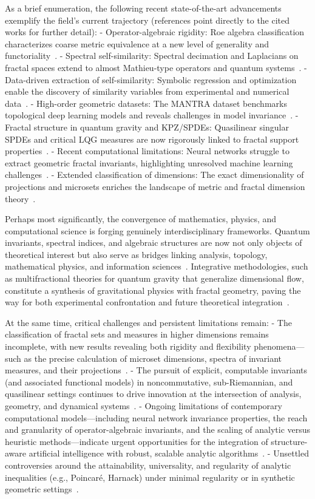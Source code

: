 \documentclass[sigconf]{acmart}
\begin{document}
As a brief enumeration, the following recent state-of-the-art advancements exemplify the field's current trajectory (references point directly to the cited works for further detail):
- Operator-algebraic rigidity: Roe algebra classification characterizes coarse metric equivalence at a new level of generality and functoriality~\cite{ref52}.
- Spectral self-similarity: Spectral decimation and Laplacians on fractal spaces extend to almost Mathieu-type operators and quantum systems~\cite{ref54}.
- Data-driven extraction of self-similarity: Symbolic regression and optimization enable the discovery of similarity variables from experimental and numerical data~\cite{ref65}.
- High-order geometric datasets: The MANTRA dataset benchmarks topological deep learning models and reveals challenges in model invariance~\cite{ref26}.
- Fractal structure in quantum gravity and KPZ/SPDEs: Quasilinear singular SPDEs and critical LQG measures are now rigorously linked to fractal support properties~\cite{ref94,ref81}.
- Recent computational limitations: Neural networks struggle to extract geometric fractal invariants, highlighting unresolved machine learning challenges~\cite{ref44,ref26}.
- Extended classification of dimensions: The exact dimensionality of projections and microsets enriches the landscape of metric and fractal dimension theory~\cite{ref69,ref72}.

Perhaps most significantly, the convergence of mathematics, physics, and computational science is forging genuinely interdisciplinary frameworks. Quantum invariants, spectral indices, and algebraic structures are now not only objects of theoretical interest but also serve as bridges linking analysis, topology, mathematical physics, and information sciences~\cite{ref65,ref92}. Integrative methodologies, such as multifractional theories for quantum gravity that generalize dimensional flow, constitute a synthesis of gravitational physics with fractal geometry, paving the way for both experimental confrontation and future theoretical integration~\cite{ref6}.

At the same time, critical challenges and persistent limitations remain:
- The classification of fractal sets and measures in higher dimensions remains incomplete, with new results revealing both rigidity and flexibility phenomena---such as the precise calculation of microset dimensions, spectra of invariant measures, and their projections~\cite{ref76,ref100,ref69,ref72}.
- The pursuit of explicit, computable invariants (and associated functional models) in noncommutative, sub-Riemannian, and quasilinear settings continues to drive innovation at the intersection of analysis, geometry, and dynamical systems~\cite{ref26,ref61,ref95}.
- Ongoing limitations of contemporary computational models---including neural network invariance properties, the reach and granularity of operator-algebraic invariants, and the scaling of analytic versus heuristic methods---indicate urgent opportunities for the integration of structure-aware artificial intelligence with robust, scalable analytic algorithms~\cite{ref44,ref60,ref26}.
- Unsettled controversies around the attainability, universality, and regularity of analytic inequalities (e.g., Poincaré, Harnack) under minimal regularity or in synthetic geometric settings~\cite{ref40,ref93}.
\end{document}
